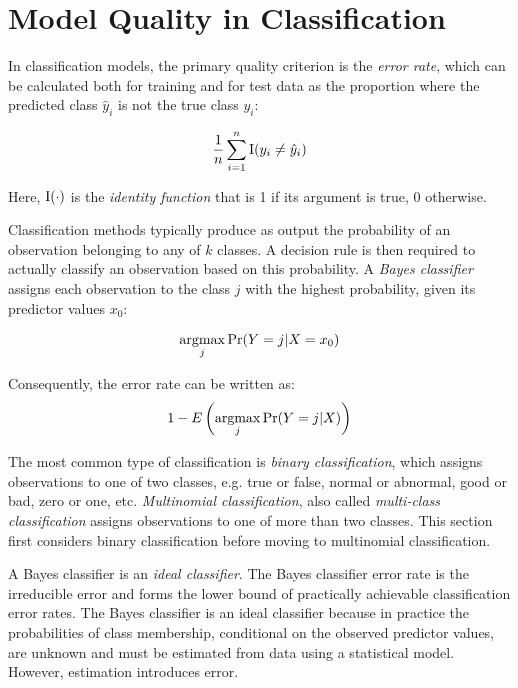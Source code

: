 \section{Model Quality in Classification}

In classification models, the primary quality criterion is the \emph{error rate}, which can be calculated both for training and for test data as the proportion where the predicted class $\hat{y}_i$ is not the true class $y_i$:

\begin{align*}
\frac{1}{n}\sum^n_{i=1} \operatorname{I}(y_i \neq \hat{y}_i)
\end{align*}

\noindent Here, $\operatorname{I}(\cdot)$ is the \emph{identity function} that is 1 if its argument is true, 0 otherwise.

Classification methods typically produce as output the probability of an observation belonging to any of $k$ classes. A decision rule is then required to actually classify an observation based on this probability. A \emph{Bayes classifier} assigns each observation to the class $j$ with the highest probability, given its predictor values $x_0$:

\begin{align*}
\operatorname*{argmax}_j \Pr(Y=j| X=x_0)
\end{align*}

\noindent Consequently, the error rate can be written as:
\begin{align*}
1 - E \left( \operatorname*{argmax}_j \Pr (Y=j | X) \right)
\end{align*}

The most common type of classification is \emph{binary classification}, which assigns observations to one of two classes, e.g. true or false, normal or abnormal, good or bad, zero or one, etc. \emph{Multinomial classification}, also called \emph{multi-class classification} assigns observations to one of more than two classes. This section first considers binary classification before moving to multinomial classification.

A Bayes classifier is an \emph{ideal classifier}. The Bayes classifier error rate is the irreducible error and forms the lower bound of practically achievable classification error rates. The Bayes classifier is an ideal classifier because in practice the probabilities of class membership, conditional on the observed predictor values, are unknown and must be estimated from data using a statistical model. However, estimation introduces error.

